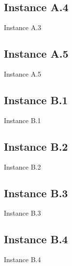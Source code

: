 \newpage
\subsection{Instance A.4}
\begin{table}[H]
\centering

\caption{Instance A.3}
\label{tblscpA3}
\end{table}

\newpage
\subsection{Instance A.5}
\begin{table}[H]
\centering

\caption{Instance A.5}
\label{tblscpA5}
\end{table}

\newpage

\subsection{Instance B.1}
\begin{table}[H]
\centering

\caption{Instance B.1}
\label{tblscpB1}
\end{table}

\newpage
\subsection{Instance B.2}
\begin{table}[H]
\centering

\caption{Instance B.2}
\label{tblscpB2}
\end{table}
\newpage

\subsection{Instance B.3}
\begin{table}[H]
\centering

\caption{Instance B.3}
\label{tblscpB3}
\end{table}
\newpage

\subsection{Instance B.4}
\begin{table}[H]
\centering

\caption{Instance B.4}
\label{tblscpB4}
\end{table}
\newpage

